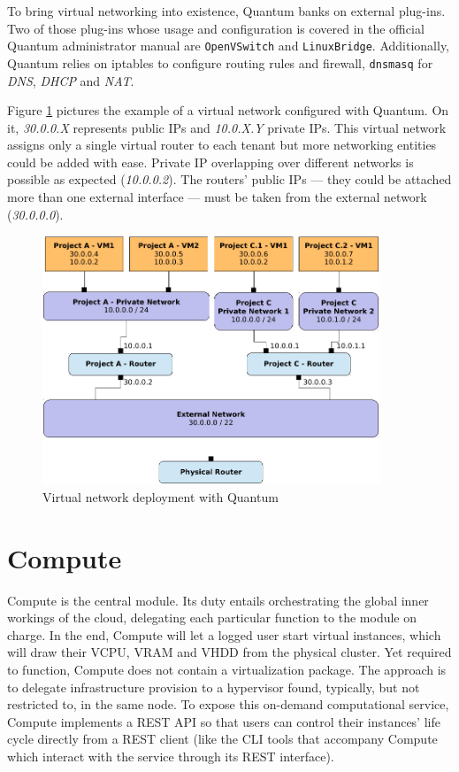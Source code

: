 To bring virtual networking into existence, Quantum banks on external plug-ins. Two of those plug-ins whose usage and configuration is covered in the official Quantum administrator manual \cite{quantumadminfolsom} are \texttt{OpenVSwitch} and \texttt{LinuxBridge}. Additionally, Quantum relies on iptables to configure routing rules and firewall, \texttt{dnsmasq} for \emph{DNS}, \emph{DHCP} and \emph{NAT}.

Figure \ref{fig:desplieguequantum} pictures the example of a virtual network configured with Quantum. On it, \emph{30.0.0.X} represents public IPs and \emph{10.0.X.Y} private IPs. This virtual network assigns only a single virtual router to each tenant but more networking entities could be added with ease. Private IP overlapping over different networks is possible as expected (\emph{10.0.0.2}). The routers' public IPs --- they could be attached more than one external interface --- must be taken from the external network (\emph{30.0.0.0}).

\begin{figure}[tbh]
\begin{center}
\includegraphics[width=0.9\textwidth]{imagenes/014.pdf}
 \caption{Virtual network deployment with Quantum}
\label{fig:desplieguequantum}
\end{center}
\end{figure}

\section{Compute}\label{sec:compute}
\noindent Compute is the central module. Its duty entails orchestrating the global inner workings of the cloud, delegating each particular function to the module on charge. In the end, Compute will let a logged user start virtual instances, which will draw their VCPU, VRAM and VHDD from the physical cluster. Yet required to function, Compute does not contain a virtualization package. The approach is to delegate infrastructure provision to a hypervisor found, typically, but not restricted to, in the same node. To expose this on-demand computational service, Compute implements a REST API so that users can control their instances' life cycle directly from a REST client (like the CLI tools that accompany Compute which interact with the service through its REST interface).

